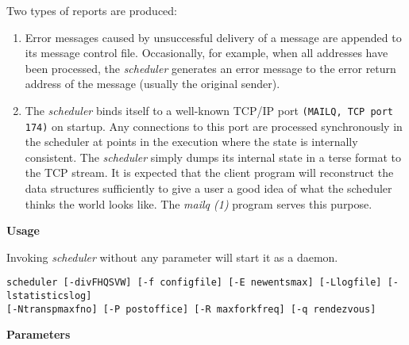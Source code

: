 Two types of reports are produced:
\begin{enumerate}
\item Error messages caused by unsuccessful delivery of a message
are appended to its message control file. Occasionally,
for example, when all addresses have been processed, the {\em scheduler\/}
generates an error message to the error return address of the message
(usually the original sender).  
\item The {\em scheduler\/} binds itself to a well-known TCP/IP port
{\tt (MAILQ, TCP port 174)} on startup.  Any connections to this port
are processed synchronously in the scheduler at points in the execution
where the state is internally consistent. The {\em scheduler\/}
simply dumps its internal state in a terse format to the TCP stream.
It is expected that the client program will reconstruct the data structures
sufficiently to give a user a good idea of what the scheduler thinks the
world looks like. The {\em mailq (1)\/} program serves this purpose.
\end{enumerate}


{\bf Usage}

Invoking {\em scheduler\/} without any parameter will start it as a daemon.

\begin{verbatim}
scheduler [-divFHQSVW] [-f configfile] [-E newentsmax] [-Llogfile] [-lstatisticslog]
[-Ntranspmaxfno] [-P postoffice] [-R maxforkfreq] [-q rendezvous]
\end{verbatim}


{\bf Parameters}

